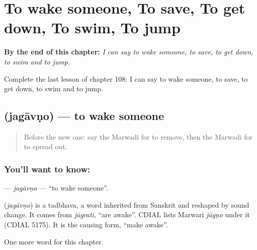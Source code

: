 
\chapter{To wake someone, To save, To get down, To swim, To jump}
\label{ch:mw-to-wake-someone-to-save-to-get-down-to-swim-to-jump}

\begin{chapteropening}
\textbf{By the end of this chapter:} \emph{I can say to wake someone, to save, to get down, to swim and to jump.}

Complete the last lesson of chapter 108: I can say to wake someone, to save, to get down, to swim and to jump.
\end{chapteropening}

\section[\texorpdfstring{\mw{जगावणो} (jagāvṇo)}{जगावणो (jagāvṇo)}]{ (jagāvṇo) — to wake someone}

\label{lesson:MW-C108-jagavno}



\begin{quote}
Before the new one: say the Marwadi for to remove, then the Marwadi for to spread out.
\end{quote}

\subsection*{You'll want to know: }
\textbf{} — \emph{jagāvṇo} — \textquotedblleft{}to wake someone\textquotedblright{}.

\begin{cousinweb}
\textbf{} (\emph{jagāvṇo}) is a tadbhava, a word inherited from Sanskrit and reshaped by sound change. It comes from \emph{jāgrati}, \textquotedblleft{}are awake\textquotedblright{}. CDIAL lists Marwari \emph{jāgṇo} under it (CDIAL 5175). It is the causing form, \textquotedblleft{}make awake\textquotedblright{}.
\end{cousinweb}

\begin{grammarlens}[title={What you've built}]
One more word for this chapter.
\end{grammarlens}


